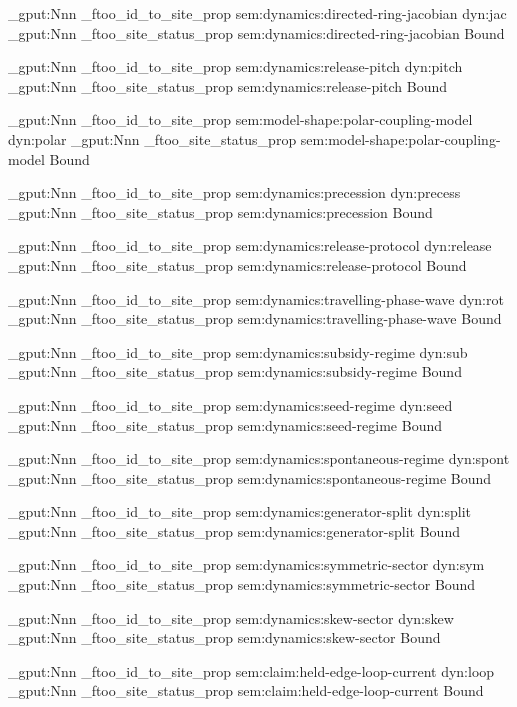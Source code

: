 \prop_gput:Nnn \g_ftoo_id_to_site_prop { sem:dynamics:directed-ring-jacobian } { dyn:jac }
\prop_gput:Nnn \g_ftoo_site_status_prop { sem:dynamics:directed-ring-jacobian } { Bound }

\prop_gput:Nnn \g_ftoo_id_to_site_prop { sem:dynamics:release-pitch } { dyn:pitch }
\prop_gput:Nnn \g_ftoo_site_status_prop { sem:dynamics:release-pitch } { Bound }

\prop_gput:Nnn \g_ftoo_id_to_site_prop { sem:model-shape:polar-coupling-model } { dyn:polar }
\prop_gput:Nnn \g_ftoo_site_status_prop { sem:model-shape:polar-coupling-model } { Bound }

\prop_gput:Nnn \g_ftoo_id_to_site_prop { sem:dynamics:precession } { dyn:precess }
\prop_gput:Nnn \g_ftoo_site_status_prop { sem:dynamics:precession } { Bound }

\prop_gput:Nnn \g_ftoo_id_to_site_prop { sem:dynamics:release-protocol } { dyn:release }
\prop_gput:Nnn \g_ftoo_site_status_prop { sem:dynamics:release-protocol } { Bound }

\prop_gput:Nnn \g_ftoo_id_to_site_prop { sem:dynamics:travelling-phase-wave } { dyn:rot }
\prop_gput:Nnn \g_ftoo_site_status_prop { sem:dynamics:travelling-phase-wave } { Bound }

\prop_gput:Nnn \g_ftoo_id_to_site_prop { sem:dynamics:subsidy-regime } { dyn:sub }
\prop_gput:Nnn \g_ftoo_site_status_prop { sem:dynamics:subsidy-regime } { Bound }

\prop_gput:Nnn \g_ftoo_id_to_site_prop { sem:dynamics:seed-regime } { dyn:seed }
\prop_gput:Nnn \g_ftoo_site_status_prop { sem:dynamics:seed-regime } { Bound }

\prop_gput:Nnn \g_ftoo_id_to_site_prop { sem:dynamics:spontaneous-regime } { dyn:spont }
\prop_gput:Nnn \g_ftoo_site_status_prop { sem:dynamics:spontaneous-regime } { Bound }

\prop_gput:Nnn \g_ftoo_id_to_site_prop { sem:dynamics:generator-split } { dyn:split }
\prop_gput:Nnn \g_ftoo_site_status_prop { sem:dynamics:generator-split } { Bound }

\prop_gput:Nnn \g_ftoo_id_to_site_prop { sem:dynamics:symmetric-sector } { dyn:sym }
\prop_gput:Nnn \g_ftoo_site_status_prop { sem:dynamics:symmetric-sector } { Bound }

\prop_gput:Nnn \g_ftoo_id_to_site_prop { sem:dynamics:skew-sector } { dyn:skew }
\prop_gput:Nnn \g_ftoo_site_status_prop { sem:dynamics:skew-sector } { Bound }

\prop_gput:Nnn \g_ftoo_id_to_site_prop { sem:claim:held-edge-loop-current } { dyn:loop }
\prop_gput:Nnn \g_ftoo_site_status_prop { sem:claim:held-edge-loop-current } { Bound }

